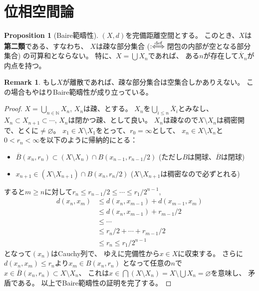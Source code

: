 \documentclass[uplatex]{jsarticle}
\theoremstyle{definition}
\newtheorem{prop}[prop]{Proposition}
\newtheorem{rem}[rem]{Remark}
\renewcommand{\emptyset}{\varnothing}
\newcommand{\deff}{:\hspace{-3pt}\overset{\text{def}}{\iff}}
\newcommand{\N}{\mathbb{N}}
\begin{document}
\section{位相空間論}



\begin{prop}[Baire範疇性]
  \label{Baire category}
  \((X,d)\)を完備距離空間とする。
  このとき、\(X\)は\textbf{第二類}である、すなわち、
  \(X\)は疎な部分集合 (\(\deff\)閉包の内部が空となる部分集合)
  の可算和とならない。
  特に、\(X = \bigcup X_n\)であれば、
  ある\(n\)が存在して\(\overline{X}_n\)が内点を持つ。
\end{prop}

\begin{rem}
  もし\(X\)が離散であれば、疎な部分集合は空集合しかありえない。
  この場合もやはりBaire範疇性が成り立っている。
\end{rem}

\begin{proof}
  \(X=\bigcup_{n\in \N} X_n\), \(X_n\)は疎、とする。
  \(X_n\)を\(\bigcup_{i\leq n}\overline{X}_i\)とみなし、
  \(X_n\subset X_{n+1}\subset \cdots\), \(X_n\)は閉かつ疎、として良い。
  \(X_n\)は疎なので\(X\setminus X_n\)は稠密開で、とくに\(\neq \emptyset\)。
  \(x_1\in X\setminus X_1\)をとって、\(r_0 = \infty\)として、
  \(x_n\in X\setminus X_n\)と\(0 < r_n < \infty\)を以下のように帰納的にとる：
  \begin{itemize}
    \item
    \(\overline{B}(x_n,r_n)\subset (X\setminus X_n)\cap B(x_{n-1},r_{n-1}/2)\)
    (ただし\(B\)は開球、\(\overline{B}\)は閉球)
    \item
    \(x_{n+1}\in (X\setminus X_{n+1})\cap B(x_n,r_n/2)\)
    (\(X\setminus X_{n+1}\)は稠密なので必ずとれる)
  \end{itemize}
  すると\(m\geq n\)に対して\(r_n \leq r_{n-1}/2 \leq \cdots \leq r_1/2^{n-1}\),
  \begin{align*}
    d(x_n,x_m)&\leq d(x_n,x_{m-1}) + d(x_{m-1},x_m) \\
    &\leq d(x_n,x_{m-1}) + r_{m-1}/2 \\
    &\leq \cdots \\
    &\leq r_n/2 + \cdots + r_{m-1}/2 \\
    &\leq r_n \leq r_1/2^{n-1}
  \end{align*}
  となって\((x_n)\)はCauchy列で、
  ゆえに完備性から\(x\in X\)に収束する。
  さらに\(d(x_n,x_m) \leq r_n\)より\(x_m\in B(x_n,r_n)\)
  となって任意の\(n\)で\(x\in \overline{B}(x_n,r_n)\subset X\setminus X_n\)、
  これは\(x\in \bigcap (X\setminus X_n) = X\setminus \bigcup X_n = \emptyset\)を意味し、
  矛盾である。
  以上でBaire範疇性の証明を完了する。
\end{proof}
\end{document}
